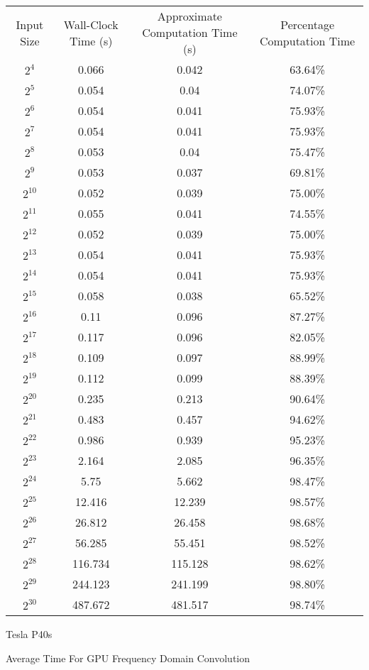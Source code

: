 \begin{center}
    \begin{tabular}{ c | c | c | c }
        Input Size & Wall-Clock Time (s) &  Approximate Computation Time (s) & Percentage Computation Time \\
$2^{4}$ & 0.066 & 0.042 & 63.64\% \\
$2^{5}$ & 0.054 & 0.04 & 74.07\% \\
$2^{6}$ & 0.054 & 0.041 & 75.93\% \\
$2^{7}$ & 0.054 & 0.041 & 75.93\% \\
$2^{8}$ & 0.053 & 0.04 & 75.47\% \\
$2^{9}$ & 0.053 & 0.037 & 69.81\% \\
$2^{10}$ & 0.052 & 0.039 & 75.00\% \\
$2^{11}$ & 0.055 & 0.041 & 74.55\% \\
$2^{12}$ & 0.052 & 0.039 & 75.00\% \\
$2^{13}$ & 0.054 & 0.041 & 75.93\% \\
$2^{14}$ & 0.054 & 0.041 & 75.93\% \\
$2^{15}$ & 0.058 & 0.038 & 65.52\% \\
$2^{16}$ & 0.11 & 0.096 & 87.27\% \\
$2^{17}$ & 0.117 & 0.096 & 82.05\% \\
$2^{18}$ & 0.109 & 0.097 & 88.99\% \\
$2^{19}$ & 0.112 & 0.099 & 88.39\% \\
$2^{20}$ & 0.235 & 0.213 & 90.64\% \\
$2^{21}$ & 0.483 & 0.457 & 94.62\% \\
$2^{22}$ & 0.986 & 0.939 & 95.23\% \\
$2^{23}$ & 2.164 & 2.085 & 96.35\% \\
$2^{24}$ & 5.75 & 5.662 & 98.47\% \\
$2^{25}$ & 12.416 & 12.239 & 98.57\% \\
$2^{26}$ & 26.812 & 26.458 & 98.68\% \\
$2^{27}$ & 56.285 & 55.451 & 98.52\% \\
$2^{28}$ & 116.734 & 115.128 & 98.62\% \\
$2^{29}$ & 244.123 & 241.199 & 98.80\% \\
$2^{30}$ & 487.672 & 481.517 & 98.74\% \\
    \end{tabular}
    
    
     Tesla P40s
    
    Average Time For GPU Frequency Domain Convolution
    

\end{center}
